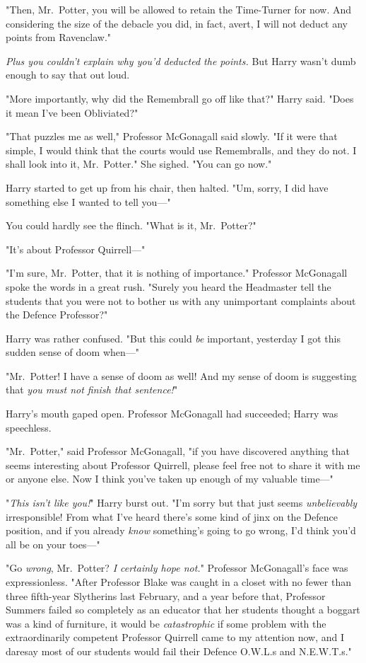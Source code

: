"Then, Mr.~Potter, you will be allowed to retain the Time-Turner for now. And 
considering the size of the debacle you did, in fact, avert, I will not deduct 
any points from Ravenclaw."

\emph{Plus you couldn't explain why you'd deducted the points.} But Harry 
wasn't dumb enough to say that out loud.

"More importantly, why did the Remembrall go off like that?" Harry said. "Does 
it mean I've been Obliviated?"

"That puzzles me as well," Professor McGonagall said slowly. "If it were that 
simple, I would think that the courts would use Remembralls, and they do not. I 
shall look into it, Mr.~Potter." She sighed. "You can go now."

Harry started to get up from his chair, then halted. "Um, sorry, I did have 
something else I wanted to tell you---"

You could hardly see the flinch. "What is it, Mr.~Potter?"

"It's about Professor Quirrell---"

"I'm sure, Mr.~Potter, that it is nothing of importance." Professor McGonagall 
spoke the words in a great rush. "Surely you heard the Headmaster tell the 
students that you were not to bother us with any unimportant complaints about 
the Defence Professor?"

Harry was rather confused. "But this could \emph{be} important, yesterday I got 
this sudden sense of doom when---"

"Mr.~Potter! I have a sense of doom as well! And my sense of doom is suggesting 
that \emph{you must not finish that sentence!}"

Harry's mouth gaped open. Professor McGonagall had succeeded; Harry was 
speechless.

"Mr.~Potter," said Professor McGonagall, "if you have discovered anything that 
seems interesting about Professor Quirrell, please feel free not to share it 
with me or anyone else. Now I think you've taken up enough of my valuable 
time---"

"\emph{This isn't like you!}" Harry burst out. "I'm sorry but that just seems 
\emph{unbelievably} irresponsible! From what I've heard there's some kind of 
jinx on the Defence position, and if you already \emph{know} something's going 
to go wrong, I'd think you'd all be on your toes---"

"Go \emph{wrong}, Mr.~Potter? \emph{I certainly hope not.}" Professor 
McGonagall's face was expressionless. "After Professor Blake was caught in a 
closet with no fewer than three fifth-year Slytherins last February, and a year 
before that, Professor Summers failed so completely as an educator that her 
students thought a boggart was a kind of furniture, it would be 
\emph{catastrophic} if some problem with the extraordinarily competent 
Professor Quirrell came to my attention now, and I daresay most of our students 
would fail their Defence O.W.L.s and N.E.W.T.s."


